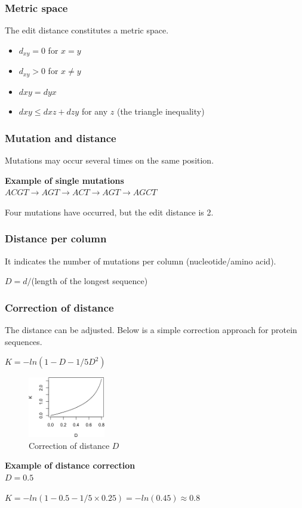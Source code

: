 %
%
\subsubsection*{Metric space}
The edit distance constitutes a metric space.
\begin{itemize}
\item $d_{xy} = 0$ for $x = y$ 
\item $d_{xy} > 0$ for $x \neq y$
\item $dxy = dyx$
\item $dxy \leq dxz + dzy$ for any $z$ (the triangle inequality)
\end{itemize}

%
%
\subsubsection*{Mutation and distance}
Mutations may occur several times on the same position.

\medskip 
\noindent
\textbf{Example of single mutations} \\

\noindent
$ACGT \rightarrow AGT \rightarrow ACT \rightarrow AGT \rightarrow AGCT$

\medskip 
\noindent
Four mutations have occurred, but the edit distance is 2.

%
%
\subsubsection*{Distance per column}
It indicates the number of mutations per column (nucleotide/amino acid).

\bigskip 
$D = d / $(length of the longest sequence)

%
%
\subsubsection*{Correction of distance}
The distance can be adjusted. Below is a simple correction approach for protein sequences.

\bigskip 
$K=-ln⁡(1-D-1/5 D^2 )$
\begin{figure}[H]
  \centering
      \includegraphics[width=0.3\textwidth]{fig03/adjust_distance.png}
      \caption{Correction of distance $D$}
\end{figure}

\medskip 
\noindent
\textbf{Example of distance correction} \\

$D = 0.5$

$K = -ln⁡(1 - 0.5 - 1/5  \times 0.25 ) = -ln(0.45) \approx 0.8⁡$

%

